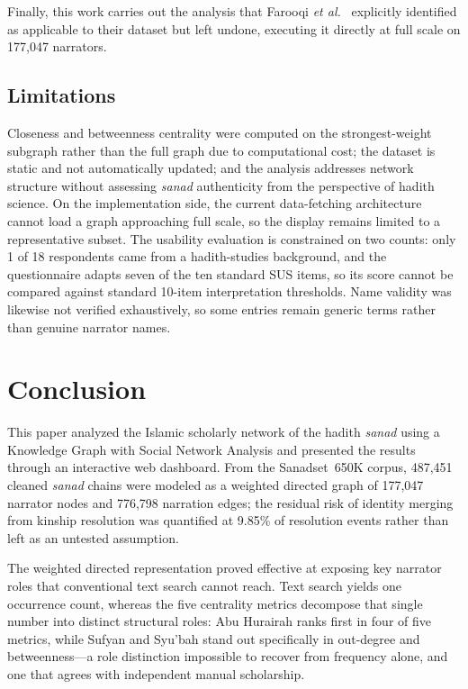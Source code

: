 \documentclass[conference]{IEEEtran}
\begin{document}
Finally, this work carries out the analysis that Farooqi \textit{et al.}\
\cite{FAROOQI2024110439} explicitly identified as applicable to their dataset but
left undone, executing it directly at full scale on 177{,}047 narrators.

\subsection{Limitations}

Closeness and betweenness centrality were computed on the strongest-weight
subgraph rather than the full graph due to computational cost; the dataset is
static and not automatically updated; and the analysis addresses network structure
without assessing \textit{sanad} authenticity from the perspective of hadith
science. On the implementation side, the current data-fetching architecture cannot
load a graph approaching full scale, so the display remains limited to a
representative subset. The usability evaluation is constrained on two counts: only
1 of 18 respondents came from a hadith-studies background, and the questionnaire
adapts seven of the ten standard SUS items, so its score cannot be compared
against standard 10-item interpretation thresholds. Name validity was likewise not
verified exhaustively, so some entries remain generic terms rather than genuine
narrator names.

\section{Conclusion}

This paper analyzed the Islamic scholarly network of the hadith \textit{sanad}
using a Knowledge Graph with Social Network Analysis and presented the results
through an interactive web dashboard. From the Sanadset~650K corpus, 487{,}451
cleaned \textit{sanad} chains were modeled as a weighted directed graph of
177{,}047 narrator nodes and 776{,}798 narration edges; the residual risk of
identity merging from kinship resolution was quantified at 9.85\% of resolution
events rather than left as an untested assumption.

The weighted directed representation proved effective at exposing key narrator
roles that conventional text search cannot reach. Text search yields one
occurrence count, whereas the five centrality metrics decompose that single number
into distinct structural roles: Abu Hurairah ranks first in four of five metrics,
while Sufyan and Syu'bah stand out specifically in out-degree and betweenness---a
role distinction impossible to recover from frequency alone, and one that agrees
with independent manual scholarship.
\end{document}
